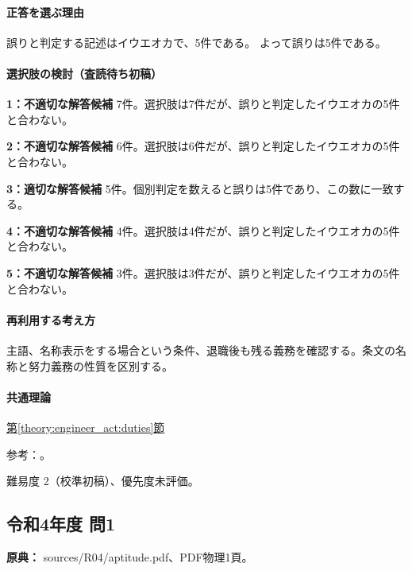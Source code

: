 \paragraph{正答を選ぶ理由} 誤りと判定する記述はイウエオカで、5件である。  よって誤りは5件である。

\paragraph{選択肢の検討（査読待ち初稿）}

\noindent\textbf{1：不適切な解答候補} 7件。選択肢は7件だが、誤りと判定したイウエオカの5件と合わない。\par

\noindent\textbf{2：不適切な解答候補} 6件。選択肢は6件だが、誤りと判定したイウエオカの5件と合わない。\par

\noindent\textbf{3：適切な解答候補} 5件。個別判定を数えると誤りは5件であり、この数に一致する。\par

\noindent\textbf{4：不適切な解答候補} 4件。選択肢は4件だが、誤りと判定したイウエオカの5件と合わない。\par

\noindent\textbf{5：不適切な解答候補} 3件。選択肢は3件だが、誤りと判定したイウエオカの5件と合わない。\par

\paragraph{再利用する考え方} 主語、名称表示をする場合という条件、退職後も残る義務を確認する。条文の名称と努力義務の性質を区別する。

\paragraph{共通理論} \hyperref[theory:engineer_act:duties]{第\ref*{theory:engineer_act:duties}節}

\par 参考：\cite{engineer_act_current}。

\par 難易度 2（校準初稿）、優先度未評価。

\subsection{令和4年度 問1}
\label{q:r04-reg-apt-01}

\noindent\textbf{原典：} sources/R04/aptitude.pdf、PDF物理1頁。

